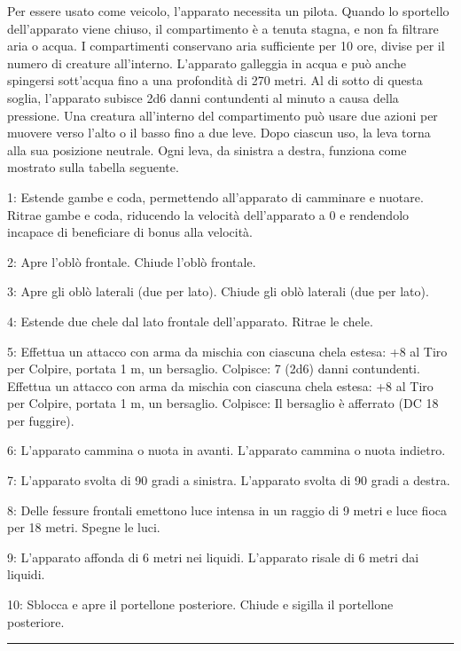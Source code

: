 \begin{multicols}{2}
Per essere usato come veicolo, l'apparato necessita un pilota. Quando lo sportello dell'apparato viene chiuso, il compartimento è a tenuta stagna, e non fa filtrare aria o acqua. I compartimenti conservano aria sufficiente per 10 ore, divise per il numero di creature all'interno. L'apparato galleggia in acqua e può anche spingersi sott'acqua fino a una profondità di 270 metri. Al di sotto di questa soglia, l'apparato subisce 2d6 danni contundenti al minuto a causa della pressione. Una creatura all'interno del compartimento può usare due azioni per muovere verso l'alto o il basso fino a due leve. Dopo ciascun uso, la leva torna alla sua posizione neutrale. Ogni leva, da sinistra a destra, funziona come mostrato sulla tabella seguente.

1: Estende gambe e coda, permettendo all'apparato di camminare e nuotare. Ritrae gambe e coda, riducendo la velocità dell'apparato a 0 e rendendolo incapace di beneficiare di bonus alla velocità.

2: Apre l'oblò frontale. Chiude l'oblò frontale.

3: Apre gli oblò laterali (due per lato). Chiude gli oblò laterali (due per lato).

4: Estende due chele dal lato frontale dell'apparato. Ritrae le chele.

5: Effettua un attacco con arma da mischia con ciascuna chela estesa: +8 al Tiro per Colpire, portata 1 m, un bersaglio. Colpisce: 7 (2d6) danni contundenti. Effettua un attacco con arma da mischia con ciascuna chela estesa: +8 al Tiro per Colpire, portata 1 m, un bersaglio. Colpisce: Il bersaglio è afferrato (DC 18 per fuggire).

6: L'apparato cammina o nuota in avanti. L'apparato cammina o nuota indietro.

7: L'apparato svolta di 90 gradi a sinistra. L'apparato svolta di 90 gradi a destra.

8: Delle fessure frontali emettono luce intensa in un raggio di 9 metri e luce fioca per 18 metri. Spegne le luci.

9: L'apparato affonda di 6 metri nei liquidi. L'apparato risale di 6 metri dai liquidi.

10: Sblocca e apre il portellone posteriore. Chiude e sigilla il portellone posteriore.

\smallskip\noindent\rule{\linewidth}{2pt}  \hypertarget{Ariete}{}\medskip{}\noindent\label{Ariete}


\end{multicols}
